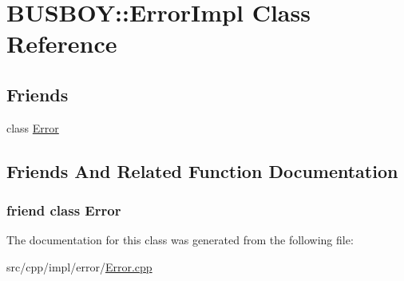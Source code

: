 \hypertarget{classBUSBOY_1_1ErrorImpl}{
\section{BUSBOY::ErrorImpl Class Reference}
\label{classBUSBOY_1_1ErrorImpl}
}
\subsection*{Friends}
\begin{DoxyCompactItemize}
\item 
class \hyperlink{classBUSBOY_1_1ErrorImpl_a16d3937baa3679c525821223427be40b}{Error}
\end{DoxyCompactItemize}


\subsection{Friends And Related Function Documentation}
\hypertarget{classBUSBOY_1_1ErrorImpl_a16d3937baa3679c525821223427be40b}{
\subsubsection[{Error}]{\setlength{\rightskip}{0pt plus 5cm}friend class {\bf Error}}}
\label{classBUSBOY_1_1ErrorImpl_a16d3937baa3679c525821223427be40b}


The documentation for this class was generated from the following file:\begin{DoxyCompactItemize}
\item 
src/cpp/impl/error/\hyperlink{Error_8cpp}{Error.cpp}\end{DoxyCompactItemize}

